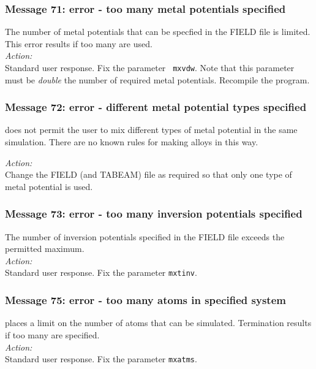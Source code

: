 \subsubsection*{Message 71: error - too many metal potentials specified}

The number of metal potentials  that can be specfied in the FIELD file
is limited. This error results if too many are used. \\

\noindent
{\em Action:} \\ Standard user response. Fix the parameter {\tt
mxvdw}.  Note that this parameter must be {\em double} the number of
required metal potentials. Recompile the
program.

\subsubsection*{Message 72: error - different metal potential types
specified}

\D{} does not permit the user to mix different types of metal potential
in the same simulation. There are no known rules for making alloys in
this way.

\noindent
{\em Action:}\\
Change the FIELD (and TABEAM) file as required so that only one type
of metal potential is used.

\subsubsection*{Message 73: error - too many inversion potentials specified}

The number of inversion potentials specified in the FIELD file exceeds
the permitted maximum.\\

\noindent
{\em Action:}\\
Standard user response. Fix the parameter {\tt mxtinv}.

\subsubsection*{Message 75: error - too many atoms in specified system}

\D{} places a limit on the number of atoms that can be simulated.
Termination results if too many are specified.  \\ 

\noindent
{\em Action:} \\ 
Standard user response. Fix the parameter {\tt mxatms}.

